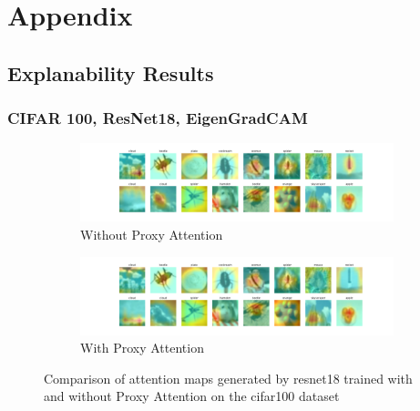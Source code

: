 \chapter{Appendix} \label{ch:appendix}
\section{Explanability Results}

\subsection{CIFAR 100, ResNet18, EigenGradCAM}
% 
\begin{figure}[!htb]
    \centering
    \begin{subfigure}[b]{1\textwidth}
        \includegraphics[width=\textwidth]{images/cifar100_resnet18_noproxy_1.pdf}
        \caption{Without Proxy Attention}
    \end{subfigure}
    \hfill
    \begin{subfigure}[b]{1\textwidth}
        \includegraphics[width=\textwidth]{images/cifar100_resnet18_proxy_1.pdf}
        \caption{With Proxy Attention}
    \end{subfigure}
    \caption{Comparison of attention maps generated by resnet18 trained with and without Proxy Attention on the cifar100 dataset}
\end{figure}


